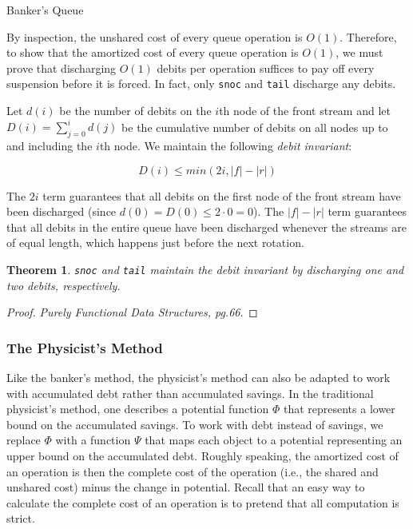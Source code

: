 \documentclass[12pt, a4paper]{article} %
\newtheorem{theorem}{Theorem}[section]     %
\newcommand{\code}[1]{\texttt{#1}} %
\begin{document}
\begin{listing}[H]
  \inputminted[breaklines=true]{haskell}{../../Chapter6/BankersQueue.hs}
  \caption{Banker's Queue}
  \label{lst:banker's queue}
\end{listing}

By inspection, the unshared cost of every queue operation is $O(1)$. Therefore, to show that the amortized cost of every queue operation is $O(1)$, we must prove that discharging $O(1)$ debits per operation suffices to pay off every suspension before it is forced. In fact, only \code{snoc} and \code{tail} discharge any debits.

Let $d(i)$ be the number of debits on the $i$th node of the front stream and let $D(i) = \sum_{j = 0}^{i} d(j)$ be the cumulative number of debits on all nodes up to and including the $i$th node. We maintain the following \textit{debit invariant}:

\[
  D(i) \leq min(2i, |f| - |r|)
\]

The $2i$ term guarantees that all debits on the first node of the front stream have been discharged (since $d(0) = D(0) \leq 2 \cdot 0 = 0$). The $|f| - |r|$ term guarantees that all debits in the entire queue have been discharged whenever the streams are of equal length, which happens just before the next rotation.

\begin{theorem}
  \code{snoc} and \code{tail} maintain the debit invariant by discharging one and two debits, respectively.
\end{theorem}

\begin{proof}
  \textit{Purely Functional Data Structures, pg.66}.
\end{proof}

\subsubsection{The Physicist's Method}%

Like the banker's method, the physicist's method can also be adapted to work with accumulated debt rather than accumulated savings. In the traditional physicist's method, one describes a potential function $\Phi$ that represents a lower bound on the accumulated savings. To work with debt instead of savings, we replace $\Phi$ with a function $\Psi$ that maps each object to a potential representing an upper bound on the accumulated debt. Roughly speaking, the amortized cost of an operation is then the complete cost of the operation (i.e., the shared and unshared cost) minus the change in potential. Recall that an easy way to calculate the complete cost of an operation is to pretend that all computation is strict.
\end{document}
